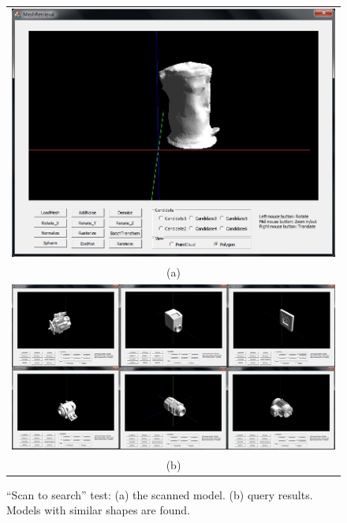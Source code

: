 \begin{figure}
\begin{center}
\begin{tabular}{c}   %
   \includegraphics[height=0.4\columnwidth]{input_bin_scantosearch_test}\\
   (a)\\
   \includegraphics[width=0.95\linewidth]{output_bin_scantosearch_test}  \\
   (b)\\
\end{tabular}
\caption{``Scan to search'' test: (a) the scanned model. (b) query results.  Models with similar shapes are found. } 
  \label{scantosearchtest_bin_UI}
\end{center}
\end{figure}

